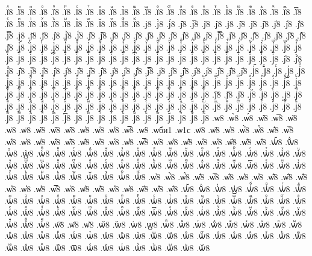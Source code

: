 {.їⷧ8
.їⷨ8
.їⷩ8
.їⷪ8
.їⷫ8
.їⷬ8
.їⷭ8
.їⷮ8
.їⷯ8
.їⷰ8
.їⷱ8
.їⷲ8
.їⷳ8
.їⷴ8
.їⷵ8
.їⷶ8
.їⷷ8
.їⷸ8
.їⷹ8
.їⷺ8
.їⷻ8
.їⷼ8
.їⷽ8
.їⷾ8
.їⷿ8
.ї꙯8
.їꙴ8
.їꙵ8
.їꙶ8
.їꙷ8
.їꙸ8
.їꙹ8
.їꙺ8
.їꙻ8
.ї꙼8
.ї꙽8
.їꚞ8
.їꚟ8
.ј8
.ј̀8
.ј́8
.ј̂8
.ј̅8
.ј̆8
.ј̇8
.ј̈8
.ј̋8
.ј̏8
.ј̑8
.ј̓8
.ј̔8
.ј̾8
.ј̿8
.ј͘8
.ј҃8
.ј҄8
.ј҅8
.ј҅̀8
.ј҅́8
.ј҅̂8
.ј҅̅8
.ј҅̆8
.ј҅̇8
.ј҅̈8
.ј҅̋8
.ј҅̏8
.ј҅̑8
.ј҅̓8
.ј҅̔8
.ј҅̾8
.ј҅̿8
.ј҅͘8
.ј҅҃8
.ј҅҄8
.ј҅҅8
.ј҅҆8
.ј҅҇8
.ј҅᷀8
.ј҅᷁8
.ј҅᷶8
.ј᷷҅8
.ј᷸҅8
.ј᷹҅8
.ј҅ⷠ8
.ј҅ⷡ8
.ј҅ⷢ8
.ј҅ⷣ8
.ј҅ⷤ8
.ј҅ⷥ8
.ј҅ⷦ8
.ј҅ⷧ8
.ј҅ⷨ8
.ј҅ⷩ8
.ј҅ⷪ8
.ј҅ⷫ8
.ј҅ⷬ8
.ј҅ⷭ8
.ј҅ⷮ8
.ј҅ⷯ8
.ј҅ⷰ8
.ј҅ⷱ8
.ј҅ⷲ8
.ј҅ⷳ8
.ј҅ⷴ8
.ј҅ⷵ8
.ј҅ⷶ8
.ј҅ⷷ8
.ј҅ⷸ8
.ј҅ⷹ8
.ј҅ⷺ8
.ј҅ⷻ8
.ј҅ⷼ8
.ј҅ⷽ8
.ј҅ⷾ8
.ј҅ⷿ8
.ј҅꙯8
.ј҅ꙴ8
.ј҅ꙵ8
.ј҅ꙶ8
.ј҅ꙷ8
.ј҅ꙸ8
.ј҅ꙹ8
.ј҅ꙺ8
.ј҅ꙻ8
.ј҅꙼8
.ј҅꙽8
.ј҅ꚞ8
.ј҅ꚟ8
.ј҆8
.ј҆̀8
.ј҆́8
.ј҆̂8
.ј҆̅8
.ј҆̆8
.ј҆̇8
.ј҆̈8
.ј҆̋8
.ј҆̏8
.ј҆̑8
.ј҆̓8
.ј҆̔8
.ј҆̾8
.ј҆̿8
.ј҆͘8
.ј҆҃8
.ј҆҄8
.ј҆҅8
.ј҆҆8
.ј҆҇8
.ј҆᷀8
.ј҆᷁8
.ј҆᷶8
.ј᷷҆8
.ј᷸҆8
.ј᷹҆8
.ј҆ⷠ8
.ј҆ⷡ8
.ј҆ⷢ8
.ј҆ⷣ8
.ј҆ⷤ8
.ј҆ⷥ8
.ј҆ⷦ8
.ј҆ⷧ8
.ј҆ⷨ8
.ј҆ⷩ8
.ј҆ⷪ8
.ј҆ⷫ8
.ј҆ⷬ8
.ј҆ⷭ8
.ј҆ⷮ8
.ј҆ⷯ8
.ј҆ⷰ8
.ј҆ⷱ8
.ј҆ⷲ8
.ј҆ⷳ8
.ј҆ⷴ8
.ј҆ⷵ8
.ј҆ⷶ8
.ј҆ⷷ8
.ј҆ⷸ8
.ј҆ⷹ8
.ј҆ⷺ8
.ј҆ⷻ8
.ј҆ⷼ8
.ј҆ⷽ8
.ј҆ⷾ8
.ј҆ⷿ8
.ј҆꙯8
.ј҆ꙴ8
.ј҆ꙵ8
.ј҆ꙶ8
.ј҆ꙷ8
.ј҆ꙸ8
.ј҆ꙹ8
.ј҆ꙺ8
.ј҆ꙻ8
.ј҆꙼8
.ј҆꙽8
.ј҆ꚞ8
.ј҆ꚟ8
.ј҇8
.ј᷀8
.ј᷁8
.ј᷶8
.ј᷷8
.ј᷸8
.ј᷹8
.јⷠ8
.јⷡ8
.јⷢ8
.јⷣ8
.јⷤ8
.јⷥ8
.јⷦ8
.јⷧ8
.јⷨ8
.јⷩ8
.јⷪ8
.јⷫ8
.јⷬ8
.јⷭ8
.јⷮ8
.јⷯ8
.јⷰ8
.јⷱ8
.јⷲ8
.јⷳ8
.јⷴ8
.јⷵ8
.јⷶ8
.јⷷ8
.јⷸ8
.јⷹ8
.јⷺ8
.јⷻ8
.јⷼ8
.јⷽ8
.јⷾ8
.јⷿ8
.ј꙯8
.јꙴ8
.јꙵ8
.јꙶ8
.јꙷ8
.јꙸ8
.јꙹ8
.јꙺ8
.јꙻ8
.ј꙼8
.ј꙽8
.јꚞ8
.јꚟ8
.ѡ8
.ѡ̀8
.ѡ́8
.ѡ̂8
.ѡ̅8
.ѡ̆8
.ѡ̇8
.ѡ̈8
.ѡ̋8
.ѡ̏8
.ѡ̑8
.ѡ̓8
.ѡ̔8
.ѡ̾8
.ѡ̿8
.ѡ͘8
.ѡби1
.ѡ1с
.ѡ҃8
.ѡ҄8
.ѡ҅8
.ѡ҅̀8
.ѡ҅́8
.ѡ҅̂8
.ѡ҅̅8
.ѡ҅̆8
.ѡ҅̇8
.ѡ҅̈8
.ѡ҅̋8
.ѡ҅̏8
.ѡ҅̑8
.ѡ҅̓8
.ѡ҅̔8
.ѡ҅̾8
.ѡ҅̿8
.ѡ҅͘8
.ѡ҅҃8
.ѡ҅҄8
.ѡ҅҅8
.ѡ҅҆8
.ѡ҅҇8
.ѡ҅᷀8
.ѡ҅᷁8
.ѡ҅᷶8
.ѡ᷷҅8
.ѡ᷸҅8
.ѡ᷹҅8
.ѡ҅ⷠ8
.ѡ҅ⷡ8
.ѡ҅ⷢ8
.ѡ҅ⷣ8
.ѡ҅ⷤ8
.ѡ҅ⷥ8
.ѡ҅ⷦ8
.ѡ҅ⷧ8
.ѡ҅ⷨ8
.ѡ҅ⷩ8
.ѡ҅ⷪ8
.ѡ҅ⷫ8
.ѡ҅ⷬ8
.ѡ҅ⷭ8
.ѡ҅ⷮ8
.ѡ҅ⷯ8
.ѡ҅ⷰ8
.ѡ҅ⷱ8
.ѡ҅ⷲ8
.ѡ҅ⷳ8
.ѡ҅ⷴ8
.ѡ҅ⷵ8
.ѡ҅ⷶ8
.ѡ҅ⷷ8
.ѡ҅ⷸ8
.ѡ҅ⷹ8
.ѡ҅ⷺ8
.ѡ҅ⷻ8
.ѡ҅ⷼ8
.ѡ҅ⷽ8
.ѡ҅ⷾ8
.ѡ҅ⷿ8
.ѡ҅꙯8
.ѡ҅ꙴ8
.ѡ҅ꙵ8
.ѡ҅ꙶ8
.ѡ҅ꙷ8
.ѡ҅ꙸ8
.ѡ҅ꙹ8
.ѡ҅ꙺ8
.ѡ҅ꙻ8
.ѡ҅꙼8
.ѡ҅꙽8
.ѡ҅ꚞ8
.ѡ҅ꚟ8
.ѡ҆8
.ѡ҆̀8
.ѡ҆́8
.ѡ҆̂8
.ѡ҆̅8
.ѡ҆̆8
.ѡ҆̇8
.ѡ҆̈8
.ѡ҆̋8
.ѡ҆̏8
.ѡ҆̑8
.ѡ҆̓8
.ѡ҆̔8
.ѡ҆̾8
.ѡ҆̿8
.ѡ҆͘8
.ѡ҆҃8
.ѡ҆҄8
.ѡ҆҅8
.ѡ҆҆8
.ѡ҆҇8
.ѡ҆᷀8
.ѡ҆᷁8
.ѡ҆᷶8
.ѡ᷷҆8
.ѡ᷸҆8
.ѡ᷹҆8
.ѡ҆ⷠ8
.ѡ҆ⷡ8
.ѡ҆ⷢ8
.ѡ҆ⷣ8
.ѡ҆ⷤ8
.ѡ҆ⷥ8
.ѡ҆ⷦ8
.ѡ҆ⷧ8
.ѡ҆ⷨ8
.ѡ҆ⷩ8
.ѡ҆ⷪ8
.ѡ҆ⷫ8
.ѡ҆ⷬ8
.ѡ҆ⷭ8
.ѡ҆ⷮ8
.ѡ҆ⷯ8
.ѡ҆ⷰ8
.ѡ҆ⷱ8
.ѡ҆ⷲ8
.ѡ҆ⷳ8
.ѡ҆ⷴ8
.ѡ҆ⷵ8
.ѡ҆ⷶ8
.ѡ҆ⷷ8
.ѡ҆ⷸ8
.ѡ҆ⷹ8
.ѡ҆ⷺ8
.ѡ҆ⷻ8
.ѡ҆ⷼ8
.ѡ҆ⷽ8
.ѡ҆ⷾ8
.ѡ҆ⷿ8
.ѡ҆꙯8
.ѡ҆ꙴ8
.ѡ҆ꙵ8
.ѡ҆ꙶ8
.ѡ҆ꙷ8
.ѡ҆ꙸ8
.ѡ҆ꙹ8
.ѡ҆ꙺ8
.ѡ҆ꙻ8
.ѡ҆꙼8
.ѡ҆꙽8
.ѡ҆ꚞ8
.ѡ҆ꚟ8
.ѡ҇8
.ѡ᷀8
.ѡ᷁8
.ѡ᷶8
.ѡ᷷8
.ѡ᷸8
.ѡ᷹8
.ѡⷠ8
.ѡⷡ8
.ѡⷢ8
.ѡⷣ8
.ѡⷤ8
.ѡⷥ8
.ѡⷦ8
.ѡⷧ8
.ѡⷨ8
.ѡⷩ8
.ѡⷪ8
.ѡⷫ8
.ѡⷬ8
.ѡⷭ8
.ѡⷮ8
.ѡⷯ8
.ѡⷰ8
.ѡⷱ8
.ѡⷲ8
.ѡⷳ8
.ѡⷴ8
.ѡⷵ8
.ѡⷶ8
.ѡⷷ8
.ѡⷸ8
.ѡⷹ8
.ѡⷺ8
.ѡⷻ8
.ѡⷼ8
.ѡⷽ8
.ѡⷾ8
.ѡⷿ8
.ѡ꙯8
.ѡꙴ8
.ѡꙵ8
.ѡꙶ8
.ѡꙷ8
.ѡꙸ8
.ѡꙹ8
.ѡꙺ8
.ѡꙻ8
}
